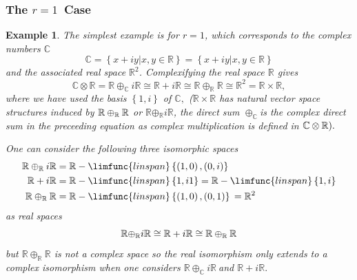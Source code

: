 \documentclass[aps,preprint]{revtex4}
\newtheorem{example}[theorem]{Example}
\begin{document}
\subsubsection{\textbf{The }$r=1$\textbf{\ Case}}

\begin{example}
The simplest example is for $r=1$, which corresponds to the complex numbers $%
\mathbb{C}$ 
\begin{equation}
\mathbb{C}=\left\{ \left. x+iy\right\vert x,y\in \mathbb{R}\right\} =\left\{
\left. x+iy\right\vert x,y\in \mathbb{R}\right\}
\end{equation}%
and the associated real space $\mathbb{R}^{2}$. Complexifying the real space 
$\mathbb{R}$ gives 
\begin{equation}
\mathbb{C\otimes R}=\mathbb{R}\oplus _{\mathbb{C}}i\mathbb{R\cong R}+i%
\mathbb{R\cong R\oplus _{\mathbb{R}}R\cong R}^{2}=\mathbb{R\times R},
\end{equation}%
where we have used the basis $\left\{ 1,i\right\} $ of $\mathbb{C},$ ($%
\mathbb{R\times R}$ has natural vector space structures induced by $\mathbb{%
R\oplus _{\mathbb{R}}R}$ or $\mathbb{R}\mathbb{\oplus }\mathbb{_{\mathbb{R}}}%
i\mathbb{R}$, the direct sum $\oplus _{\mathbb{C}}$is the complex direct sum
in the preceeding equation as complex multiplication is defined in $\mathbb{%
C\otimes R}).$

One can consider the following three isomorphic spaces 
\begin{align}
\mathbb{R}\oplus _{\mathbb{R}}i\mathbb{R}& =\mathbb{R}-\limfunc{linspan}%
\left\{ \left( 1,0\right) ,\left( 0,i\right) \right\} \\
\mathbb{R}+i\mathbb{R}& =\mathbb{R}-\limfunc{linspan}\left\{ 1,i1\right\} =%
\mathbb{R}-\limfunc{linspan}\left\{ 1,i\right\} \\
\mathbb{R\oplus _{\mathbb{R}}R}& =\mathbb{R}-\limfunc{linspan}\left\{ \left(
1,0\right) ,\left( 0,1\right) \right\} \,=\mathbb{R}^{2}
\end{align}%
as real spaces 
\begin{equation}
\mathbb{R\oplus _{\mathbb{R}}}i\mathbb{R\cong R}+i\mathbb{R\cong R\oplus _{%
\mathbb{R}}R}
\end{equation}%
but $\mathbb{R\oplus _{\mathbb{R}}R}$ is not a complex space so the real
isomorphism only extends to a complex isomorphism when one considers $%
\mathbb{R}\oplus _{\mathbb{C}}i\mathbb{R\ }$and $\mathbb{R}+i\mathbb{R}.$


\end{example}
\end{document}
